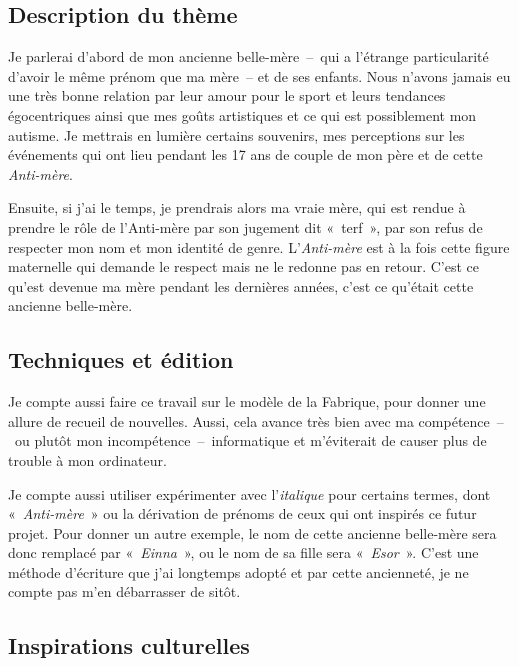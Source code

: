 \documentclass[12pt,french,letterpaper]{article}
\begin{document}
\normalsize{\hypertarget{description-du-thuxe8me}{%
\subsection{Description du thème}\label{description-du-thuxe8me}}

Je parlerai d'abord de mon ancienne belle-mère~--~qui a l'étrange
particularité d'avoir le même prénom que ma mère~-- et de ses enfants.
Nous n'avons jamais eu une très bonne relation par leur amour pour le
sport et leurs tendances égocentriques ainsi que mes goûts artistiques
et ce qui est possiblement mon autisme. Je mettrais en lumière certains
souvenirs, mes perceptions sur les événements qui ont lieu pendant les
17 ans de couple de mon père et de cette \emph{Anti-mère}.

Ensuite, si j'ai le temps, je prendrais alors ma vraie mère, qui est
rendue à prendre le rôle de l'Anti-mère par son jugement dit «~terf~»,
par son refus de respecter mon nom et mon identité de genre.
L'\emph{Anti-mère} est à la fois cette figure maternelle qui demande le
respect mais ne le redonne pas en retour. C'est ce qu'est devenue ma
mère pendant les dernières années, c'est ce qu'était cette ancienne
belle-mère.

\hypertarget{techniques-et-uxe9dition}{%
\subsection{Techniques et édition}\label{techniques-et-uxe9dition}}

Je compte aussi faire ce travail sur le modèle de la Fabrique, pour
donner une allure de recueil de nouvelles. Aussi, cela avance très bien
avec ma compétence~--~ou plutôt mon incompétence~--~informatique et
m'éviterait de causer plus de trouble à mon ordinateur.

Je compte aussi utiliser expérimenter avec l'\emph{italique} pour
certains termes, dont «~\emph{Anti-mère}~» ou la dérivation de prénoms
de ceux qui ont inspirés ce futur projet. Pour donner un autre exemple,
le nom de cette ancienne belle-mère sera donc remplacé par
«~\emph{Einna}~», ou le nom de sa fille sera «~\emph{Esor}~». C'est une
méthode d'écriture que j'ai longtemps adopté et par cette ancienneté, je
ne compte pas m'en débarrasser de sitôt.

\hypertarget{inspirations-culturelles}{%
\subsection{Inspirations culturelles}\label{inspirations-culturelles}}

}
\end{document}
